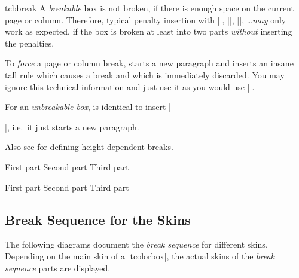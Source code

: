\begin{docCommand}[doc new=2017-07-05]{tcbbreak}{}
  A \emph{breakable} box is not broken, if there is enough
  space on the current page or column.
  Therefore, typical penalty insertion with
  |\break|, |\pagebreak|, |\columnbreak|, \ldots \emph{may} only work as
  expected, if the box is broken at least into two parts
  \emph{without} inserting the penalties.\par\smallskip
  To \emph{force} a page or column break, 
  starts a new paragraph and inserts an insane tall rule which causes a
  break and which is immediately discarded. You may ignore this technical
  information and just use it as you would use |\pagebreak|.\par\smallskip
  For an \emph{unbreakable box},  is identical to insert |\par|,
  i.e.\ it just starts a new paragraph.\par\smallskip
  Also see  for defining height dependent breaks.

\begin{dispListing}
\begin{multicols}{3}
  \begin{tcolorbox}[breakable,enhanced jigsaw,size=small,
    colback=red!5!white,colframe=red!75!black,fonttitle=\bfseries,
    title=Break into parts
  ]
  First part\tcbbreak
  Second part\tcbbreak
  Third part
  \end{tcolorbox}
\end{multicols}

\begin{multicols}{3}
  \begin{tcolorbox}[enhanced jigsaw,size=small,
    colback=red!5!white,colframe=red!75!black,fonttitle=\bfseries,
    title=You shall not break
  ]
  First part\tcbbreak
  Second part\tcbbreak
  Third part
  \end{tcolorbox}
\end{multicols}

\end{dispListing}
{\tcbusetemp}

\end{docCommand}



\clearpage
\subsection{Break Sequence for the Skins}\label{subsec:breaksequence}
The following diagrams document the \emph{break sequence} for different
skins. Depending on the main skin of a |tcolorbox|, the actual skins of
the \emph{break sequence} parts are displayed.

